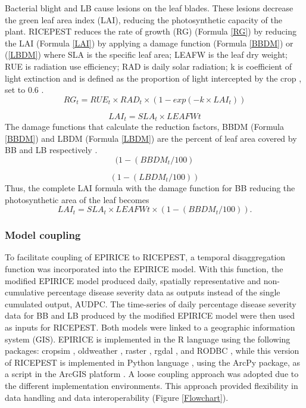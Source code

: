 \documentclass[preprint,review,12pt]{elsarticle}
\begin{document}
    Bacterial blight and LB cause lesions on the leaf blades. These lesions decrease the green leaf area index (LAI), reducing the photosynthetic capacity of the plant. RICEPEST reduces the rate of growth (RG) (Formula \ref{RG}) by reducing the LAI (Formula \ref{LAI}) by applying a damage function (Formula \ref{BBDM}) or (\ref{LBDM}) where SLA is the specific leaf area; LEAFW is the leaf dry weight; RUE is radiation use efficiency; RAD is daily solar radiation; k is coefficient of light extinction and is defined as the proportion of light intercepted by the crop \cite{Willocquet2000}, set to 0.6 \cite{Willocquet2002}.
    \begin{equation}
    RG_t = RUE_t \times RAD_t \times (1- exp(- k \times LAI_t))
    \label{RG}
    \end{equation}
    
    \begin{equation}
    LAI_t = SLA_t \times LEAFWt
    \label{LAI}
    \end{equation}
    The damage functions that calculate the reduction factors, BBDM (Formula \ref{BBDM}) and LBDM (Formula \ref{LBDM}) are the percent of leaf area covered by BB and LB respectively \cite{Willocquet2002}. 
    \begin{equation}
    (1-(BBDM_t /100)
    \label{BBDM}
    \end{equation}
    
    \begin{equation}
    (1-(LBDM_t /100))
    \label{LBDM}
    \end{equation}
    Thus, the complete LAI formula with the damage function for BB reducing the photosynthetic area of the leaf becomes
     \begin{equation}
    LAI_t = SLA_t \times LEAFWt \times (1-(BBDM_t / 100)).
    \label{LAIBBDM}
    \end{equation}
    
    \subsubsection{Model coupling}
    To facilitate coupling of EPIRICE to RICEPEST, a temporal disaggregation function was incorporated into the EPIRICE model. With this function, the modified EPIRICE model produced daily, spatially representative and non-cumulative percentage disease severity data as outputs instead of the single cumulated output, AUDPC. The time-series of daily percentage disease severity data for BB and LB produced by the modified EPIRICE model were then used as inputs for RICEPEST. Both models were linked to a geographic information system (GIS). EPIRICE is implemented in the R language using the following packages: cropsim \cite{Hijmans2009}, oldweather \cite{Hijmans2009}, raster \cite{Hijmans2014}, rgdal \cite{Bivand2014}, and RODBC \cite{Ripley2013}, while this version of RICEPEST is implemented in Python language \cite{python}, using the ArcPy package, as a script in the ArcGIS platform \cite{ESRI2011}. A loose coupling approach was adopted due to the different implementation environments. This approach provided flexibility in data handling and data interoperability (Figure \ref{Flowchart}).
    
\end{document}
